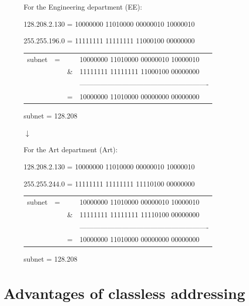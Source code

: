 \documentclass[a4paper]{systems-software}
\begin{document}
\begin{figure}[H]
{\begin{minipage}{\dimexpr \textwidth-2\fboxsep-2\fboxrule}
			For the Engineering department (EE):
			
			128.208.2.130 = 10000000 11010000 00000010 10000010
			
			255.255.196.0 = 11111111 11111111 11000100 00000000
			
			\begin{longtabu} to \textwidth {X[0.7,l] X[0.1,l] X[0.1,l] X[6,l]}
				subnet & = & & 10000000 11010000 00000010 10000010
				\\
				&   & \& & 11111111 11111111 11000100 00000000
				\\
				& & & -------------------------------------------------------
				\\
				&   & = & 10000000 11010000 00000000 00000000
			\end{longtabu}
			
			subnet = 128.208
			
			\begin{center}
				$\downarrow$
			\end{center}
		
			For the Art department (Art):
			
			128.208.2.130 = 10000000 11010000 00000010 10000010
			
			255.255.244.0 = 11111111 11111111 11110100 00000000
			
			\begin{longtabu} to \textwidth {X[0.7,l] X[0.1,l] X[0.1,l] X[6,l]}
				subnet & = & & 10000000 11010000 00000010 10000010
				\\
				&   & \& & 11111111 11111111 11110100 00000000
				\\
				& & & -------------------------------------------------------
				\\
				&   & = & 10000000 11010000 00000000 00000000
			\end{longtabu}
			
			subnet = 128.208
	\end{minipage}}
\end{figure}


\newpage

\section*{Advantages of classless addressing}
\end{document}
